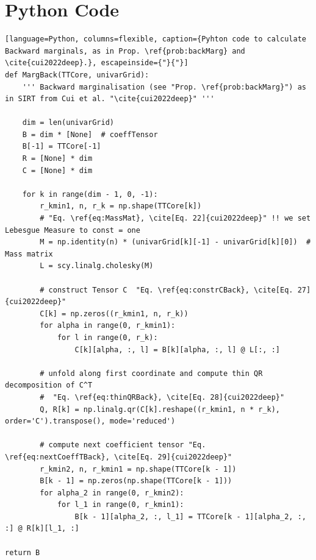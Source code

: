 \section{Python Code}
\the\baselineskip

\begin{lstlisting}[language=Python, columns=flexible, caption={Pyhton code to calculate Backward marginals, as in Prop. \ref{prob:backMarg} and \cite{cui2022deep}.}, escapeinside={"}{"}]
def MargBack(TTCore, univarGrid):
	''' Backward marginalisation (see "Prop. \ref{prob:backMarg}") as in SIRT from Cui et al. "\cite{cui2022deep}" '''
	
	dim = len(univarGrid)
	B = dim * [None]  # coeffTensor
	B[-1] = TTCore[-1]
	R = [None] * dim
	C = [None] * dim
	
	for k in range(dim - 1, 0, -1):
		r_kmin1, n, r_k = np.shape(TTCore[k])
		# "Eq. \ref{eq:MassMat}, \cite[Eq. 22]{cui2022deep}" !! we set Lebesgue Measure to const = one
		M = np.identity(n) * (univarGrid[k][-1] - univarGrid[k][0])  # Mass matrix
		L = scy.linalg.cholesky(M)
		
		# construct Tensor C  "Eq. \ref{eq:constrCBack}, \cite[Eq. 27]{cui2022deep}"
		C[k] = np.zeros((r_kmin1, n, r_k))
		for alpha in range(0, r_kmin1):
			for l in range(0, r_k):
				C[k][alpha, :, l] = B[k][alpha, :, l] @ L[:, :]
		
		# unfold along first coordinate and compute thin QR decomposition of C^T
		#  "Eq. \ref{eq:thinQRBack}, \cite[Eq. 28]{cui2022deep}"
		Q, R[k] = np.linalg.qr(C[k].reshape((r_kmin1, n * r_k), order='C').transpose(), mode='reduced')
		
		# compute next coefficient tensor "Eq. \ref{eq:nextCoeffTBack}, \cite[Eq. 29]{cui2022deep}"
		r_kmin2, n, r_kmin1 = np.shape(TTCore[k - 1])
		B[k - 1] = np.zeros(np.shape(TTCore[k - 1]))
		for alpha_2 in range(0, r_kmin2):
			for l_1 in range(0, r_kmin1):
				B[k - 1][alpha_2, :, l_1] = TTCore[k - 1][alpha_2, :, :] @ R[k][l_1, :]

return B

\end{lstlisting}
\clearpage
